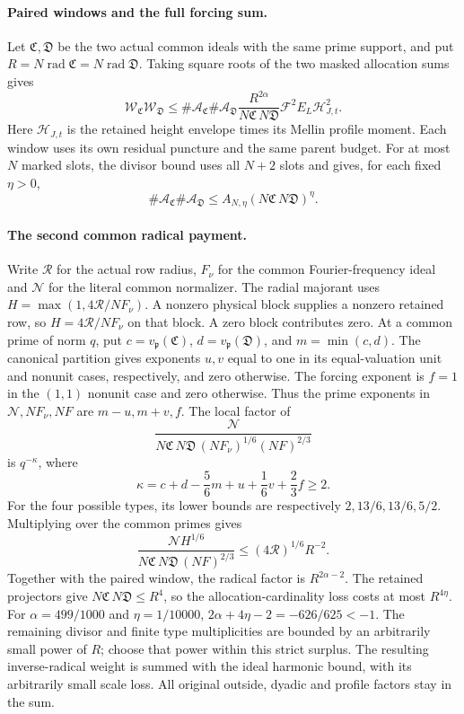 \paragraph{Paired windows and the full forcing sum.}
Let \(\mathfrak C,\mathfrak D\) be the two actual common ideals with
the same prime support, and put
\(R=N\operatorname{rad}\mathfrak C=N\operatorname{rad}\mathfrak D\).
Taking square roots of the two masked allocation sums gives
\[
 \mathcal W_{\mathfrak C}\mathcal W_{\mathfrak D}
 \le\#\mathcal A_{\mathfrak C}\#\mathcal A_{\mathfrak D}
       \frac{R^{2\alpha}}{N\mathfrak C\,N\mathfrak D}
       \mathcal F^2E_L\mathcal H_{J,t}^2.
\]
Here \(\mathcal H_{J,t}\) is the retained height envelope times its
Mellin profile moment. Each window uses its own residual puncture
and the same parent budget. For at most \(N\) marked slots, the
divisor bound uses all \(N+2\) slots and gives, for each fixed
\(\eta>0\),
\[
 \#\mathcal A_{\mathfrak C}\#\mathcal A_{\mathfrak D}
 \le A_{N,\eta}(N\mathfrak C\,N\mathfrak D)^\eta.
\]
\paragraph{The second common radical payment.}
Write \(\mathcal R\) for the actual row radius, \(F_\nu\) for the
common Fourier-frequency ideal and \(\mathcal N\) for the literal
common normalizer. The radial majorant uses
\(H=\max(1,4\mathcal R/NF_\nu)\).
A nonzero physical block supplies a nonzero retained row, so
\(H=4\mathcal R/NF_\nu\) on that block. A zero block contributes zero.
At a common prime of norm \(q\), put
\(c=v_{\mathfrak p}(\mathfrak C)\),
\(d=v_{\mathfrak p}(\mathfrak D)\), and \(m=\min(c,d)\).
The canonical partition gives exponents \(u,v\) equal to one in
its equal-valuation unit and nonunit cases, respectively, and zero
otherwise. The forcing exponent is \(f=1\) in the \((1,1)\) nonunit
case and zero otherwise. Thus the prime exponents in
\(\mathcal N,NF_\nu,NF\) are \(m-u,m+v,f\).
The local factor of
\[
 \frac{\mathcal N}
 {N\mathfrak C\,N\mathfrak D\,(NF_\nu)^{1/6}(NF)^{2/3}}
\]
is \(q^{-\kappa}\), where
\[
 \kappa=c+d-\frac56m+u+\frac16v+\frac23f\ge2.
\]
For the four possible types, its lower bounds are respectively
\(2,13/6,13/6,5/2\). Multiplying over the common primes gives
\[
 \frac{\mathcal N H^{1/6}}
 {N\mathfrak C\,N\mathfrak D\,(NF)^{2/3}}
 \le (4\mathcal R)^{1/6}R^{-2}.
\]
Together with the paired window, the radical factor is
\(R^{2\alpha-2}\). The retained projectors give
\(N\mathfrak C\,N\mathfrak D\le R^4\), so the allocation-cardinality
loss costs at most \(R^{4\eta}\). For
\(\alpha=499/1000\) and \(\eta=1/10000\),
\(2\alpha+4\eta-2=-626/625<-1\).
The remaining divisor and finite type multiplicities are bounded by
an arbitrarily small power of \(R\); choose that power within this
strict surplus. The resulting inverse-radical weight is summed with
the ideal harmonic bound, with its arbitrarily small scale loss.
All original outside, dyadic and profile factors stay in the sum.

